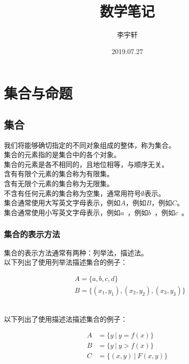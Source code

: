 \documentclass[UTF8]{ctexart}
\title{数学笔记}
\author{李宇轩}
\date{2019.07.27}
\begin{document}
\maketitle

\newpage

\tableofcontents

\newpage

\setlength{\parindent}{0pt}

\section{集合与命题}

\subsection{集合}
    我们将能够确切指定的不同对象组成的整体，称为集合。\\[3mm]
    集合的元素指的是集合中的各个对象。\\[3mm]
    集合的元素是各不相同的，且地位相等，与顺序无关。\\[6mm]
    含有有限个元素的集合称为有限集。\\[3mm]
    含有无限个元素的集合称为无限集。\\[3mm]
    不含有任何元素的集合称为空集，通常用符号$\emptyset$表示。\\[6mm]
    集合通常使用大写英文字母表示，例如$A$，例如$B$，例如$C$。\\[3mm]
    集合通常使用小写英文字母表示，例如$a$~，例如$b$~，例如$c$~。\\

\subsubsection{集合的表示方法}
    集合的表示方法通常有两种：列举法，描述法。\\[3mm]
    以下列出了使用列举法描述集合的例子：
    \begin{large}
        \begin{align*}
            &A=\big\{ a,b,c,d\big\}\\[3mm]
            &B=\big\{ (x_1,y_1),(x_2,y_2),(x_3,y_3) \big\}
        \end{align*}
    \end{large}\\
    以下列出了使用描述法描述集合的例子：
    \begin{large}
        \begin{align*}
            A&=\big\{ y~|~y=f(x)\big\}\\[3mm]
            B&=\big\{ y~|~y>f(x)\big\}\\[3mm]
            C&=\big\{ (x,y)~|~F(x,y)\big\}
        \end{align*}
    \end{large}
\end{document}
